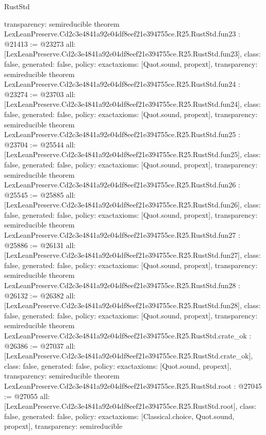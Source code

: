 \begin{lexlean}{RustStd}
\begin{coremodule}
{  transparency: semireducible
}
theorem LexLeanPreserve.Cd2c3e4841a92e04df8eef21e394755ce.R25.RustStd.fun23 : @21413 := @23273 {
  all: [LexLeanPreserve.Cd2c3e4841a92e04df8eef21e394755ce.R25.RustStd.fun23],
  class: false,
  generated: false,
  policy: exact{axioms: [Quot.sound, propext]},
  transparency: semireducible
}
theorem LexLeanPreserve.Cd2c3e4841a92e04df8eef21e394755ce.R25.RustStd.fun24 : @23274 := @23703 {
  all: [LexLeanPreserve.Cd2c3e4841a92e04df8eef21e394755ce.R25.RustStd.fun24],
  class: false,
  generated: false,
  policy: exact{axioms: [Quot.sound, propext]},
  transparency: semireducible
}
theorem LexLeanPreserve.Cd2c3e4841a92e04df8eef21e394755ce.R25.RustStd.fun25 : @23704 := @25544 {
  all: [LexLeanPreserve.Cd2c3e4841a92e04df8eef21e394755ce.R25.RustStd.fun25],
  class: false,
  generated: false,
  policy: exact{axioms: [Quot.sound, propext]},
  transparency: semireducible
}
theorem LexLeanPreserve.Cd2c3e4841a92e04df8eef21e394755ce.R25.RustStd.fun26 : @25545 := @25885 {
  all: [LexLeanPreserve.Cd2c3e4841a92e04df8eef21e394755ce.R25.RustStd.fun26],
  class: false,
  generated: false,
  policy: exact{axioms: [Quot.sound, propext]},
  transparency: semireducible
}
theorem LexLeanPreserve.Cd2c3e4841a92e04df8eef21e394755ce.R25.RustStd.fun27 : @25886 := @26131 {
  all: [LexLeanPreserve.Cd2c3e4841a92e04df8eef21e394755ce.R25.RustStd.fun27],
  class: false,
  generated: false,
  policy: exact{axioms: [Quot.sound, propext]},
  transparency: semireducible
}
theorem LexLeanPreserve.Cd2c3e4841a92e04df8eef21e394755ce.R25.RustStd.fun28 : @26132 := @26382 {
  all: [LexLeanPreserve.Cd2c3e4841a92e04df8eef21e394755ce.R25.RustStd.fun28],
  class: false,
  generated: false,
  policy: exact{axioms: [Quot.sound, propext]},
  transparency: semireducible
}
theorem LexLeanPreserve.Cd2c3e4841a92e04df8eef21e394755ce.R25.RustStd.crate_ok : @26386 := @27037 {
  all: [LexLeanPreserve.Cd2c3e4841a92e04df8eef21e394755ce.R25.RustStd.crate_ok],
  class: false,
  generated: false,
  policy: exact{axioms: [Quot.sound, propext]},
  transparency: semireducible
}
theorem LexLeanPreserve.Cd2c3e4841a92e04df8eef21e394755ce.R25.RustStd.root : @27045 := @27055 {
  all: [LexLeanPreserve.Cd2c3e4841a92e04df8eef21e394755ce.R25.RustStd.root],
  class: false,
  generated: false,
  policy: exact{axioms: [Classical.choice, Quot.sound, propext]},
  transparency: semireducible
}


\end{coremodule}
\end{lexlean}

